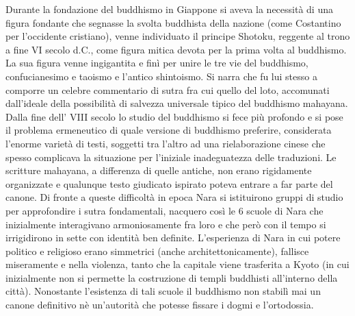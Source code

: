 \documentclass[10pt,a4paper]{report}
\begin{document}
Durante la fondazione del buddhismo in Giappone si aveva la necessità di una figura fondante che segnasse la svolta buddhista della nazione (come Costantino per l'occidente cristiano), venne individuato il  principe Shotoku, reggente al trono a fine VI secolo d.C., come figura mitica devota per la prima volta al buddhismo. La sua figura venne ingigantita e finì per unire le tre vie del buddhismo, confucianesimo e taoismo e l'antico shintoismo. Si narra che fu lui stesso a comporre un celebre commentario di sutra fra cui quello del loto, accomunati dall'ideale della possibilità di salvezza universale tipico del buddhismo mahayana.\\
Dalla fine dell' VIII secolo lo studio del buddhismo si fece più profondo e si pose il problema ermeneutico di quale versione di buddhismo preferire, considerata l'enorme varietà di testi, soggetti tra l'altro ad una rielaborazione cinese che spesso complicava la situazione per l'iniziale inadeguatezza delle traduzioni. Le scritture mahayana, a differenza di quelle antiche, non erano rigidamente organizzate e qualunque testo giudicato ispirato poteva entrare a far parte del canone. Di fronte a queste difficoltà in epoca Nara si istituirono gruppi di studio per approfondire i sutra fondamentali, nacquero così le 6 scuole di Nara che inizialmente interagivano armoniosamente fra loro e che però con il tempo si irrigidirono in sette con identità ben definite. L'esperienza di Nara in cui potere politico e religioso erano simmetrici (anche architettonicamente), fallisce miseramente e nella violenza, tanto che la capitale viene trasferita a Kyoto (in cui inizialmente non si permette la costruzione di templi buddhisti all'interno della città). Nonostante l'esistenza di tali scuole il buddhismo non stabilì mai un canone definitivo nè un'autorità che potesse fissare i dogmi e l'ortodossia. 
\end{document}
